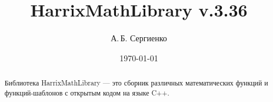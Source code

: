 \documentclass[a4paper,12pt]{article}
\title{HarrixMathLibrary v.3.36}
\author{А.\,Б. Сергиенко}
\date{\today}
\begin{document}


\maketitle

\begin{abstract}
Библиотека HarrixMathLibrary --- это сборник различных математических функций и функций-шаблонов с открытым кодом на языке C++.
\end{abstract}

\tableofcontents
\end{document}
